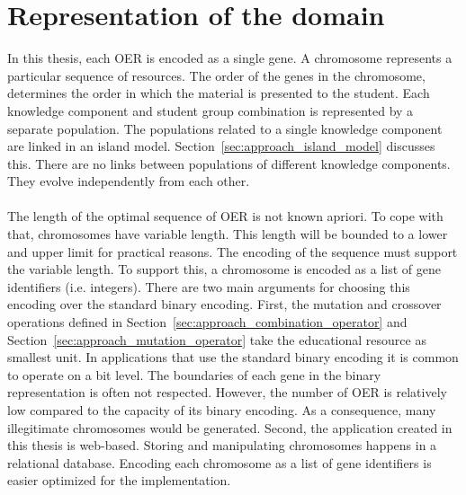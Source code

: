 \section{Representation of the domain}
\label{sec:approach_representation}
In this thesis, each OER is encoded as a single gene. A
chromosome represents a particular sequence of resources. The order of the
genes in the chromosome, determines the order in which the material is presented to
the student. Each knowledge component and student group combination is represented
by a separate population. The populations related to a single knowledge
component are linked in an island model.
Section~\ref{sec:approach_island_model} discusses this. There are no links
between populations of different knowledge components. They evolve
independently from each other.\\\\
\noindent
The length of the optimal sequence of OER is not known apriori. To cope with
that, chromosomes have variable length. This length will be
bounded to a lower and upper limit for practical reasons. The encoding of the
sequence must support the variable length. To support this, a chromosome is
encoded as a list of gene identifiers (i.e. integers).  There are two main
arguments for choosing this encoding over the standard binary encoding.
First, the mutation and crossover operations defined in Section~\ref{sec:approach_combination_operator}
and Section~\ref{sec:approach_mutation_operator}
take the educational resource as smallest unit. In applications that use the
standard binary encoding it is common to operate on a bit level. The boundaries
of each gene in the binary representation is often not respected. However, the
number of OER is relatively low compared to the capacity of its binary
encoding. As a consequence, many illegitimate chromosomes would be generated.
Second, the application created in this thesis is web-based. Storing and
manipulating chromosomes happens in a relational database. Encoding each
chromosome as a list of gene identifiers is easier optimized for the
implementation.

